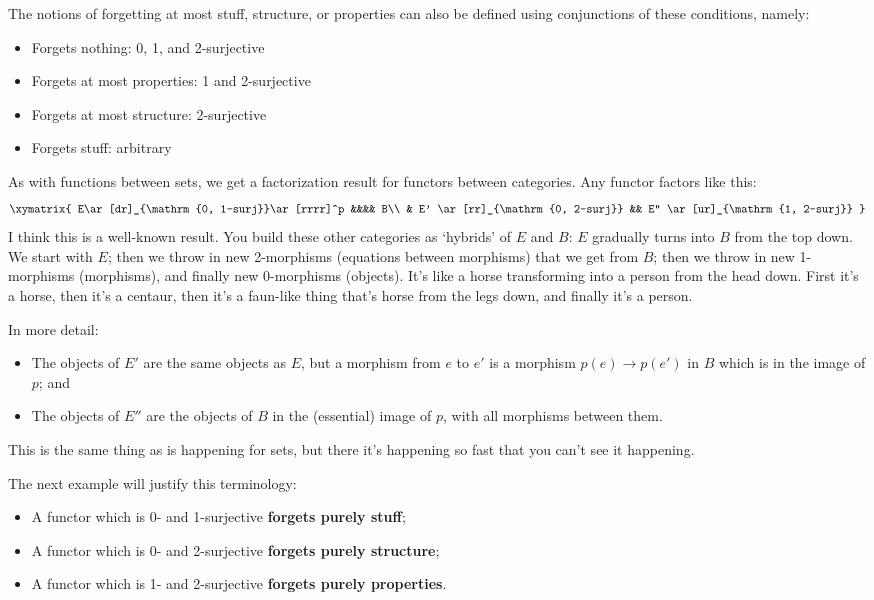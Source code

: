\documentclass[12pt]{amsart}
\begin{document}
The notions of forgetting at most stuff, structure,
or properties can also be defined using conjunctions of these
conditions, namely:
\begin{itemize}
\item Forgets nothing: 0, 1, and 2-surjective
\item Forgets at most properties: 1 and 2-surjective
\item Forgets at most structure: 2-surjective
\item Forgets stuff: arbitrary
\end{itemize}

As with functions between sets, we get a factorization result for
functors between categories.  Any functor factors like this:
\[\xymatrix{
E\ar[dr]_{\mathrm{0, 1-surj}}\ar[rrrr]^p &&&& B\\
& E' \ar[rr]_{\mathrm{0, 2-surj}} && E'' \ar[ur]_{\mathrm{1, 2-surj}}
}\]
I think this is a well-known result.
You build these other categories as `hybrids' of $E$ and $B$:
$E$ gradually turns into $B$ from the top down.
We start with $E$; then we throw in new 2-morphisms 
(equations between morphisms) that we get from $B$; then 
we throw in new 1-morphisms (morphisms), and finally 
new 0-morphisms (objects).  It's like a horse transforming into 
a person from the head down.   First it's a
horse, then it's a centaur, then it's a faun-like thing that's horse 
from the legs down, and finally it's a person.

In more detail:
\begin{itemize}
\item The objects of $E'$ are the same objects as $E$, but a morphism
  from $e$ to $e'$ is a morphism $p(e)\to p(e')$ in $B$ which is in
  the image of $p$; and
\item The objects of $E''$ are the objects of $B$ in the (essential)
  image of $p$, with all morphisms between them.
\end{itemize}
This is the same thing as is happening for sets, but there it's
happening so fast that you can't see it happening.

The next example will justify this terminology:

\begin{itemize}
\item A functor which is 0- and 1-surjective \textbf{forgets purely stuff};
\item A functor which is 0- and 2-surjective \textbf{forgets purely structure};
\item A functor which is 1- and 2-surjective \textbf{forgets purely properties}.
\end{itemize}
\end{document}
